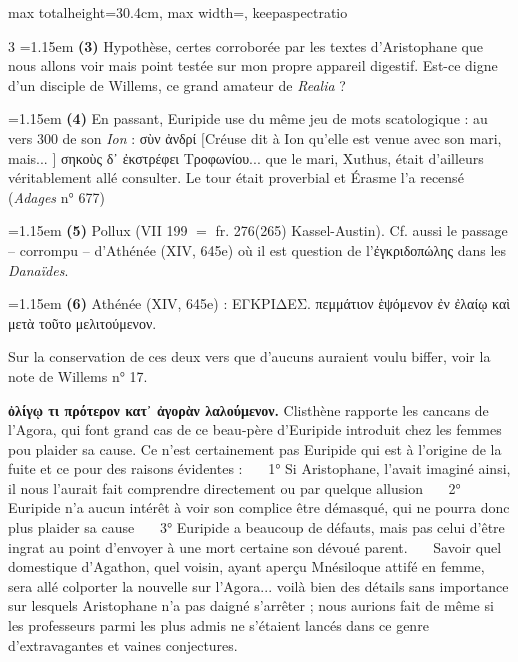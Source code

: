 \documentclass[11pt,twoside]{book}
\newcommand{\italique}[1]{\textit{#1}}
\begin{document}
\begin{adjustbox}{max totalheight=30.4cm, max width=\textwidth, keepaspectratio}
\begin{minipage}{\textwidth}
{\begin{multicols}{3}
\noindent\hangindent=1.15em {\color{sepiaNote}\textbf{(3)}} Hypothèse, certes corroborée par les textes d'Aristophane que nous allons voir mais point testée sur mon propre appareil digestif. Est-ce digne d'un disciple de Willems, ce grand amateur de \italique{Realia} ?
\par\vspace{1.5pt}
\noindent\hangindent=1.15em {\color{sepiaNote}\textbf{(4)}} En passant, Euripide use du même jeu de mots scatologique : au vers 300 de son \italique{Ion} : σὺν ἀνδρί $[$Créuse dit à Ion qu'elle est venue avec son mari, mais... ] σηκοὺς δ᾽ ἐκστρέφει Τροφωνίου... que le mari, Xuthus, était d'ailleurs véritablement allé consulter. Le tour était proverbial et Érasme l'a recensé (\italique{Adages} n° 677)
\par\vspace{1.5pt}
\noindent\hangindent=1.15em {\color{sepiaNote}\textbf{(5)}} Pollux (VII 199 $=$ fr. 276(265) Kassel-Austin). Cf. aussi le passage -- corrompu -- d'Athénée (XIV, 645e) où il est question de l'ἐγκριδοπώλης dans les \italique{Danaïdes}.
\par\vspace{1.5pt}
\noindent\hangindent=1.15em {\color{sepiaNote}\textbf{(6)}} Athénée (XIV, 645e) : ΕΓΚΡΙΔΕΣ. πεμμάτιον ἑψόμενον ἐν ἐλαίῳ καὶ μετὰ τοῦτο μελιτούμενον.
\par\vspace{1.5pt}
 \textbf{} Sur la conservation de ces deux vers que d'aucuns auraient voulu biffer, voir la note de Willems n° 17.
\par\vspace{1.5pt}
 \textbf{ὀλίγῳ τι πρότερον κατ᾽ ἀγορὰν λαλούμενον.} Clisthène rapporte les cancans de l'Agora, qui font grand cas de ce beau-père d'Euripide introduit chez les femmes pou plaider sa cause. Ce n'est certainement pas Euripide qui est à l'origine de la fuite et ce pour des raisons évidentes : \ \ \ 1° Si Aristophane, l'avait imaginé ainsi, il nous l'aurait fait comprendre directement ou par quelque allusion \ \ \ 2° Euripide n'a aucun intérêt à voir son complice être démasqué, qui ne pourra donc plus plaider sa cause \ \ \ 3° Euripide a beaucoup de défauts, mais pas celui d'être ingrat au point d'envoyer à une mort certaine son dévoué parent. \ \ \ Savoir quel domestique d'Agathon, quel voisin, ayant aperçu Mnésiloque attifé en femme, sera allé colporter la nouvelle sur l'Agora... voilà bien des détails sans importance sur lesquels Aristophane n'a pas daigné s'arrêter ; nous aurions fait de même si les professeurs parmi les plus admis ne s'étaient lancés dans ce genre d'extravagantes et vaines conjectures.

\end{multicols}}
\end{minipage}
\end{adjustbox}
\end{document}

